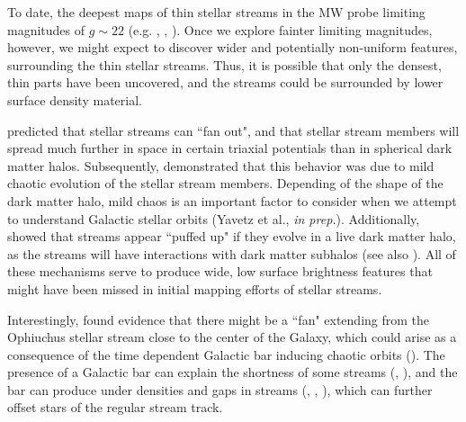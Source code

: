 \documentclass[twocolumn]{aastex62}
\newcommand{\todo}[1]{{\color{red} TODO: #1}}
\begin{document}
To date, the deepest maps of thin stellar streams in the MW probe limiting magnitudes of $g \sim 22$ (e.g. \citealt{Bernard:2016}, \citealt{Ibata:2016}, \citealt{deBoer:2018}). Once we explore fainter limiting magnitudes, however, we might expect to discover wider and potentially non-uniform features, surrounding the thin stellar streams. Thus, it is possible that only the densest, thin parts have been uncovered, and the streams could be surrounded by lower surface density material.

\citet{Pearson:2015} predicted that stellar streams  can ``fan out", and that stellar stream members will spread much further in space in certain triaxial potentials than in spherical dark matter halos. Subsequently, \citet{Price-Whelan:2016} demonstrated that this behavior was due to mild chaotic evolution of the stellar stream members. Depending of the shape of the dark matter halo, mild chaos is an important factor to consider when we attempt to understand Galactic stellar orbits (Yavetz et al., {\it in prep.}). Additionally, \citealt{Bonaca:2014} showed that streams  appear ``puffed up" if they evolve in a live dark matter halo, as the streams will have interactions with dark matter subhalos  (see also \citealt{Ibata:2002}). All of these mechanisms serve to produce wide, low surface brightness features that might have been missed in initial mapping efforts of stellar streams.

Interestingly, \citet{Sesar:2016} found evidence that there might be a ``fan" extending from the Ophiuchus stellar stream close to the center of the Galaxy, which could arise as a consequence of the time dependent Galactic bar inducing chaotic orbits (\citealt{Price-Whelan:2016b}). The presence of a Galactic bar can explain the shortness of some streams (\citealt{Hattori:2016}, \citealt{Pearson:2017}), and the bar can produce under densities and gaps in streams (\citealt{Erkal:2017}, \citealt{Pearson:2017}, \citealt{Banik:2019}), which can further offset stars of the regular stream track.


\end{document}
